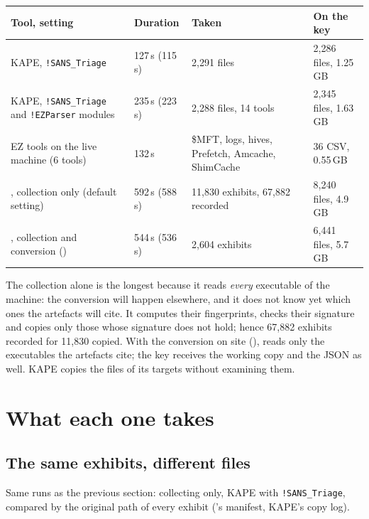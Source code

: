 \documentclass[11pt,a4paper,oneside]{report}
\begin{document}
\begin{longtable}{@{}L{5.6cm}L{2.6cm}L{3.4cm}L{3.4cm}@{}}
\toprule
\textbf{Tool, setting} & \textbf{Duration} & \textbf{Taken} & \textbf{On the key} \\
\midrule\endhead
KAPE, \texttt{!SANS\_Triage} & 127\,s (115\,s) & 2,291 files & 2,286 files, 1.25\,GB \\
KAPE, \texttt{!SANS\_Triage} and \texttt{!EZParser} modules & 235\,s (223\,s) & 2,288 files, 14 tools & 2,345 files, 1.63\,GB \\
EZ tools on the live machine (6 tools) & 132\,s & \$MFT, logs, hives, Prefetch, Amcache, ShimCache & 36 CSV, 0.55\,GB \\
\wac{}, collection only (default setting) & 592\,s (588\,s) & 11,830 exhibits, 67,882 recorded & 8,240 files, 4.9\,GB \\
\wac{}, collection and conversion () & 544\,s (536\,s) & 2,604 exhibits & 6,441 files, 5.7\,GB \\
\bottomrule
\end{longtable}

The collection alone is the longest because it reads \emph{every} executable of
the machine: the conversion will happen elsewhere, and it does not know yet
which ones the artefacts will cite. It computes their fingerprints, checks their
signature and copies only those whose signature does not hold; hence 67,882
exhibits recorded for 11,830 copied. With the conversion on site (),
\wac{} reads only the executables the artefacts cite; the key receives the
working copy and the JSON as well. KAPE copies the files of its targets without
examining them.

\chapter{What each one takes}\label{chap:taken}

\section{The same exhibits, different files}

Same runs as the previous section: \wac{} collecting only, KAPE with
\texttt{!SANS\_Triage}, compared by the original path of every exhibit
(\wac{}'s manifest, KAPE's copy log).
\end{document}
